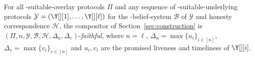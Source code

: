 \begin{conjecture}\label{conj:simulation}
  For all \rollerblade-suitable-overlay protocols $\Pi$
  and any sequence of \rollerblade-suitable-underlying
  protocols $\mathcal{Y} = (\Y[][1], \ldots, \Y[][\ell])$
  for the \rollerblade-belief-system $\mathcal{B}$ of $\mathcal{Y}$
  and honesty correspondence $\mathcal{H}$,
  the compositor \rollerblade of Section~\ref{sec:construction} is
  $(\Pi, n, \mathcal{Y}, \mathcal{B}, \mathcal{H}, \Delta_u, \Delta_v)$-\emph{faithful},
  where $n = \ell$, $\Delta_u = \max\{u_i\}_{i \in [n]}$,
  $\Delta_v = \max\{v_i\}_{v \in [n]}$
  and $u_i, v_i$ are the promised liveness and timeliness of $\Y[][i]$.
\end{conjecture}
